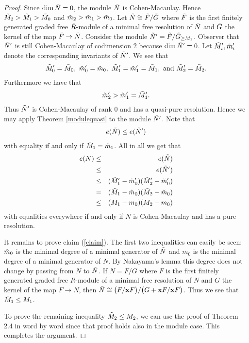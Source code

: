 \documentclass[12pt,twoside]{amsart}
\numberwithin{equation}{section}
\newcommand{\xb}{{\bf x}}
\theoremstyle{definition}
\begin{document}
\begin{proof}
Since $\dim\Tilde{N} =0$, the module $\Tilde{N}$ is Cohen-Macaulay. Hence
$\Tilde{M}_2>\Tilde{M}_1>\Tilde{M}_0$ and $\Tilde{m}_2>\Tilde{m}_1>\Tilde{m}_0$. Let
$\Tilde{N} \cong \Tilde{F}/\Tilde{G}$ where $\Tilde{F}$ is the first finitely generated
graded free $\Tilde{R}$-module of a minimal free resolution of $\Tilde{N}$ and
$\Tilde{G}$ the kernel of the map $\Tilde{F} \to \Tilde{N}$. Consider the module
$\Tilde{N}'=\Tilde{F}/\Tilde{G}_{\geq M_1}$. Observer that $\Tilde{N}'$ is still
Cohen-Macaulay of codimension 2 because $\dim \Tilde{N}'=0$. Let
$\Tilde{M}_i',\Tilde{m}_i'$ denote the corresponding invariants of $\Tilde{N}'$. We see
that
$$
\Tilde{M}_0'=\Tilde{M}_0, \
\Tilde{m}_0'=\Tilde{m}_0,\
\Tilde{M}_1'=\Tilde{m}_1'=\Tilde{M}_1,
\text{ and }
\Tilde{M}_2'=\Tilde{M}_2.
$$
Furthermore we have that
$$
\Tilde{m}_2'> \Tilde{m}_1'=\Tilde{M}_1'.
$$
Thus $\Tilde{N}'$ is Cohen-Macaulay of rank $0$ and has a quasi-pure resolution. Hence we
may apply Theorem \ref{modulequasi} to the module $\Tilde{N'}$. Note that
$$
e(\Tilde{N}) \leq e(\Tilde{N}')
$$
with equality if and only if $\Tilde{M}_1=\Tilde{m}_1$.
All in all we get that
\begin{eqnarray*}
e(N)
&\leq& e(\Tilde{N})\\
&\leq& e(\Tilde{N}')\\
&\leq& (\Tilde{M}_1'-\Tilde{m}_0')(\Tilde{M}_2'-\Tilde{m}_0')\\
& = & (\Tilde{M}_1-\Tilde{m}_0)(\Tilde{M}_2-\Tilde{m}_0)\\
& \leq & (M_1-m_0)(M_2-m_0)
\end{eqnarray*}
with equalities everywhere if and only if  $N$ is Cohen-Macaulay and has a pure resolution.

It remains to prove claim (\ref{claim}). The first two inequalities can easily be seen:
$\Tilde{m}_0$ is the minimal degree of a minimal generator of $\Tilde{N}$ and $m_0$ is
the minimal degree of a minimal generator of $N$. By Nakayama's lemma this degree does
not change by passing from $N$ to $\Tilde{N}$. If $N=F/G$ where $F$ is the first finitely
generated graded free $R$-module of a minimal free resolution of $N$ and $G$ the kernel
of the map $F \to N$, then $\Tilde{N}\cong \bigl(F/\xb F\bigr)/ \bigl(G+\xb F/\xb
F\bigr)$. Thus we see that $\Tilde{M}_1 \leq M_1$.

To prove the remaining inequality $\Tilde{M}_2\leq M_2$, we can use the proof of Theorem
2.4 in \cite{roemer} word by word since that proof holds also in the module case. This
completes the argument.
\end{proof}
\end{document}

